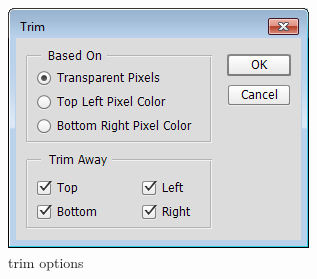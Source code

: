 \documentclass[10pt,a4paper]{article}
\begin{document}
\begin{figure}[h]
\centering
\includegraphics[width=0.7\linewidth]{trim_options}
\caption{trim options}
\label{fig:trim_options}
\end{figure}
\end{document}
